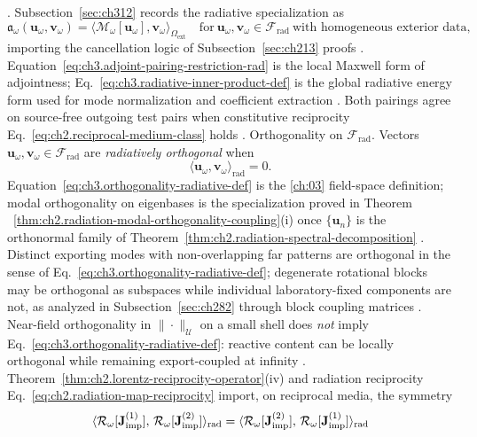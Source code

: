 \cite{stratton1941}. Subsection~\ref{sec:ch312} records the radiative specialization as
\begin{equation}
\label{eq:ch3.adjoint-pairing-restriction-rad}
\mathfrak{a}_\omega(\mathbf{u}_\omega,\mathbf{v}_\omega)
=
\langle \mathcal{M}_\omega[\mathbf{u}_\omega],\mathbf{v}_\omega\rangle_{\Omega_{\mathrm{ext}}}
\quad\text{for}\ 
\mathbf{u}_\omega,\mathbf{v}_\omega\in\mathcal{F}_{\mathrm{rad}}
\ \text{with homogeneous exterior data,}
\end{equation}
importing the cancellation logic of Subsection~\ref{sec:ch213}
proofs \cite{stratton1941}. Equation~\eqref{eq:ch3.adjoint-pairing-restriction-rad} is the local Maxwell
form of adjointness; Eq.~\eqref{eq:ch3.radiative-inner-product-def} is the global radiative energy form used
for mode normalization and coefficient extraction \cite{harrington2001}. Both pairings agree on source-free
outgoing test pairs when constitutive reciprocity Eq.~\eqref{eq:ch2.reciprocal-medium-class} holds
\cite{stratton1941}.
Orthogonality on \(\mathcal{F}_{\mathrm{rad}}\). Vectors \(\mathbf{u}_\omega,\mathbf{v}_\omega\in\mathcal{F}_{\mathrm{rad}}\) are \emph{radiatively orthogonal}
when
\begin{equation}
\label{eq:ch3.orthogonality-radiative-def}
\langle \mathbf{u}_\omega,\mathbf{v}_\omega\rangle_{\mathrm{rad}}=0.
\end{equation}
Equation~\eqref{eq:ch3.orthogonality-radiative-def} is the \ref{ch:03} field-space definition;
modal orthogonality on eigenbases is the specialization proved in Theorem
~\ref{thm:ch2.radiation-modal-orthogonality-coupling}(i) once
\(\{\mathbf{u}_n\}\) is the orthonormal family of Theorem~\ref{thm:ch2.radiation-spectral-decomposition}
\cite{stratton1941}. Distinct exporting modes with non-overlapping far patterns are orthogonal
in the sense of Eq.~\eqref{eq:ch3.orthogonality-radiative-def}; degenerate rotational blocks may be
orthogonal as subspaces while individual laboratory-fixed components are not, as analyzed in
Subsection~\ref{sec:ch282} through block coupling matrices \cite{jackson1999}. Near-field
orthogonality in \(\|\cdot\|_{\mathcal{U}}\) on a small shell does \emph{not} imply
Eq.~\eqref{eq:ch3.orthogonality-radiative-def}: reactive content can be locally orthogonal while remaining
export-coupled at infinity \cite{stratton1941}.
Theorem~\ref{thm:ch2.lorentz-reciprocity-operator}(iv) and radiation reciprocity
Eq.~\eqref{eq:ch2.radiation-map-reciprocity} import, on reciprocal media, the symmetry
\begin{equation}
\label{eq:ch3.reciprocity-symmetric-inner-product}
\langle \mathcal{R}_\omega[\mathbf{J}_{\mathrm{imp}}^{(1)}],\,\mathcal{R}_\omega[\mathbf{J}_{\mathrm{imp}}^{(2)}]\rangle_{\mathrm{rad}}
=
\langle \mathcal{R}_\omega[\mathbf{J}_{\mathrm{imp}}^{(2)}],\,\mathcal{R}_\omega[\mathbf{J}_{\mathrm{imp}}^{(1)}]\rangle_{\mathrm{rad}}
\end{equation}
